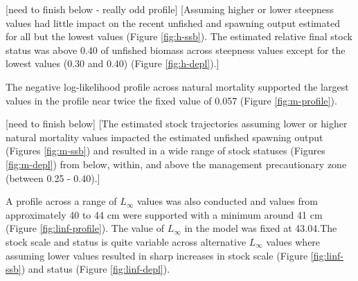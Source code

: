 \documentclass[11pt,
  english,
  a4paper,
]{article}
\begin{document}

{[}need to finish below - really odd profile{]} {[}Assuming higher or lower steepness values had little impact on the recent unfished and spawning output estimated for all but the lowest values (Figure \ref{fig:h-ssb}). The estimated relative final stock status was above 0.40 of unfished biomass across steepness values except for the lowest values (0.30 and 0.40) (Figure \ref{fig:h-depl}).{]}

\leavevmode\tagmcend\tagstructend\par


The negative log-likelihood profile across natural mortality supported the largest values in the profile near twice the fixed value of 0.057 (Figure \ref{fig:m-profile}).

\leavevmode\tagmcend\tagstructend\par


{[}need to finish below{]} {[}The estimated stock trajectories assuming lower or higher natural mortality values impacted the estimated unfished spawning output (Figures \ref{fig:m-ssb}) and resulted in a wide range of stock statuses (Figures \ref{fig:m-depl}) from below, within, and above the management precautionary zone (between 0.25 - 0.40).{]}

\leavevmode\tagmcend\tagstructend\par


A profile across a range of {\(L_{\infty}\)\leavevmode\tagmcend\tagstructend} values was also conducted and values from approximately 40 to 44 cm were supported with a minimum around 41 cm (Figure \ref{fig:linf-profile}). The value of {\(L_{\infty}\)\leavevmode\tagmcend\tagstructend} in the model was fixed at 43.04.The stock scale and status is quite variable across alternative {\(L_{\infty}\)\leavevmode\tagmcend\tagstructend} values where assuming lower values resulted in sharp increases in stock scale (Figure \ref{fig:linf-ssb}) and status (Figure \ref{fig:linf-depl}).

\leavevmode\tagmcend\tagstructend\par
\end{document}
